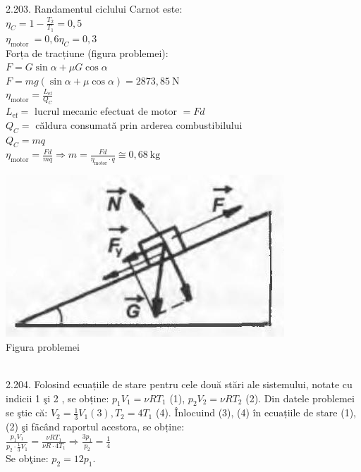 2.203. Randamentul ciclului Carnot este:\\ $\eta_{C}=1-\frac{T_{2}}{T_{1}}=0,5$\\ $\eta_{\text {motor }}=0,6 \eta_{C}=0,3$\\ Forța de tracțiune (figura problemei):\\ $F=G \sin \alpha+\mu G \cos \alpha$\\ $F=m g(\sin \alpha+\mu \cos \alpha)=2873,85 \mathrm{~N}$\\ $\eta_{\text{motor}}=\frac{L_{\text{ef}}}{Q_{C}}$\\ $L_{\text{ef}}=$ lucrul mecanic efectuat de motor $=F d$\\ $Q_{C}=$ căldura consumată prin arderea combustibilului\\ $Q_{C}=m q$\\ $\eta_{\text{motor}}=\frac{F d}{m q} \Rightarrow m=\frac{F d}{\eta_{\text{motor}} \cdot q} \cong 0,68 \mathrm{~kg}$\\ \begin{center} \includegraphics[width=0.4\linewidth]{images/2025_07_01_5b3ff9fa0d508c8e9f17g-314}\\ Figura problemei \end{center}\\

2.204. Folosind ecuațiile de stare pentru cele două stări ale sistemului, notate cu indicii 1 şi 2 , se obține: $p_{1} V_{1}=\nu R T_{1}$ (1), $p_{2} V_{2}=\nu R T_{2}$ (2). Din datele problemei se ştie că: $V_{2}=\frac{1}{3} V_{1}(3), T_{2}=4 T_{1}$ (4). Înlocuind (3), (4) în ecuațiile de stare (1), (2) şi fäcând raportul acestora, se obține:\\ $\frac{p_{1} V_{1}}{p_{2} \cdot \frac{1}{3} V_{1}}=\frac{\nu R T_{1}}{\nu R \cdot 4 T_{1}} \Rightarrow \frac{3 p_{1}}{p_{2}}=\frac{1}{4} \tag{5}$\\ Se obţine: $p_{2}=12 p_{1}$.\\

